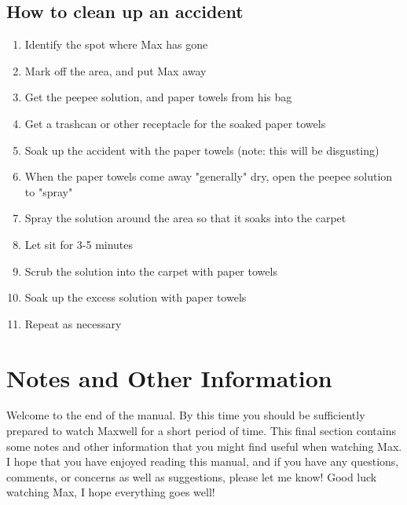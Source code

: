 \documentclass[pdftex,12pt]{article}
\begin{document}
\subsection{How to clean up an accident}
\begin{enumerate}\label{itm:how_to_clean_accident}
    \item Identify the spot where Max has gone
    \item Mark off the area, and put Max away
    \item Get the peepee solution, and paper towels from his bag
    \item Get a trashcan or other receptacle for the soaked paper towels
    \item Soak up the accident with the paper towels (note: this will be disgusting)
    \item When the paper towels come away "generally" dry, open the peepee solution to "spray"
    \item Spray the solution around the area so that it soaks into the carpet
    \item Let sit for 3-5 minutes
    \item Scrub the solution into the carpet with paper towels
    \item Soak up the excess solution with paper towels
    \item Repeat as necessary
\end{enumerate}

\clearpage
\section{Notes and Other Information}

Welcome to the end of the manual. By this time you should be sufficiently
prepared to watch Maxwell for a short period of time. This final section
contains some notes and other information that you might find useful when
watching Max. I hope that you have enjoyed reading this manual, and if you have
any questions, comments, or concerns as well as suggestions, please let me know!
Good luck watching Max, I hope everything goes well!

\bigskip
\end{document}
